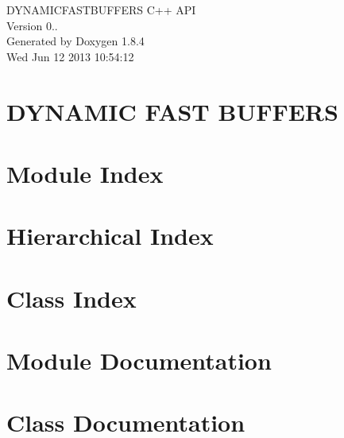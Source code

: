 \documentclass[twoside]{book}
\newcommand{\clearemptydoublepage}{%
  \newpage{\pagestyle{empty}\cleardoublepage}%
}
\begin{document}
\hypersetup{pageanchor=false}
\begin{titlepage}
\vspace*{7cm}
\begin{center}%
{\Large D\-Y\-N\-A\-M\-I\-C\-F\-A\-S\-T\-B\-U\-F\-F\-E\-R\-S C++ A\-P\-I \\[1ex]\large Version 0.. }\\
\vspace*{1cm}
{\large Generated by Doxygen 1.8.4}\\
\vspace*{0.5cm}
{\small Wed Jun 12 2013 10:54:12}\\
\end{center}
\end{titlepage}
\clearemptydoublepage
\tableofcontents
\clearemptydoublepage
{}
\hypersetup{pageanchor=true}

\chapter{D\-Y\-N\-A\-M\-I\-C F\-A\-S\-T B\-U\-F\-F\-E\-R\-S}
\label{index}\hypertarget{index}{}
\chapter{Module Index}

\chapter{Hierarchical Index}

\chapter{Class Index}

\chapter{Module Documentation}






\chapter{Class Documentation}









\newpage
{}
{}
\printindex
\end{document}
